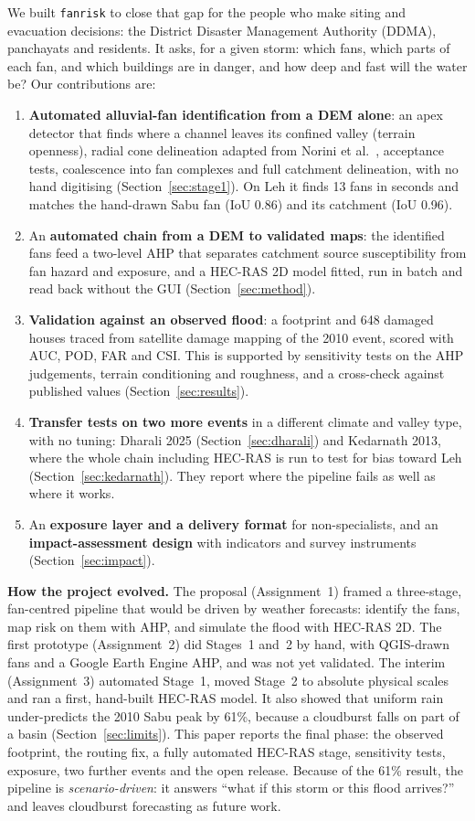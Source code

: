 \documentclass[sigconf,nonacm]{acmart}
\begin{document}
We built \texttt{fanrisk} to close that gap for the people who make siting and evacuation decisions: the District Disaster Management Authority (DDMA), panchayats and residents. It asks, for a given storm: which fans, which parts of each fan, and which buildings are in danger, and how deep and fast will the water be? Our contributions are:
\begin{enumerate}
  \item \textbf{Automated alluvial-fan identification from a DEM alone}: an apex detector that finds where a channel leaves its confined valley (terrain openness), radial cone delineation adapted from Norini et al.\ \cite{norini2016}, acceptance tests, coalescence into fan complexes and full catchment delineation, with no hand digitising (Section~\ref{sec:stage1}). On Leh it finds 13 fans in seconds and matches the hand-drawn Sabu fan (IoU 0.86) and its catchment (IoU 0.96).
  \item An \textbf{automated chain from a DEM to validated maps}: the identified fans feed a two-level AHP that separates catchment source susceptibility from fan hazard and exposure, and a HEC-RAS 2D model fitted, run in batch and read back without the GUI (Section~\ref{sec:method}).
  \item \textbf{Validation against an observed flood}: a footprint and 648 damaged houses traced from satellite damage mapping of the 2010 event, scored with AUC, POD, FAR and CSI. This is supported by sensitivity tests on the AHP judgements, terrain conditioning and roughness, and a cross-check against published values (Section~\ref{sec:results}).
  \item \textbf{Transfer tests on two more events} in a different climate and valley type, with no tuning: Dharali 2025 (Section~\ref{sec:dharali}) and Kedarnath 2013, where the whole chain including HEC-RAS is run to test for bias toward Leh (Section~\ref{sec:kedarnath}). They report where the pipeline fails as well as where it works.
  \item An \textbf{exposure layer and a delivery format} for non-specialists, and an \textbf{impact-assessment design} with indicators and survey instruments (Section~\ref{sec:impact}).
\end{enumerate}
\textbf{How the project evolved.} The proposal (Assignment~1) framed a three-stage, fan-centred pipeline that would be driven by weather forecasts: identify the fans, map risk on them with AHP, and simulate the flood with HEC-RAS 2D. The first prototype (Assignment~2) did Stages~1 and~2 by hand, with QGIS-drawn fans and a Google Earth Engine AHP, and was not yet validated. The interim (Assignment~3) automated Stage~1, moved Stage~2 to absolute physical scales and ran a first, hand-built HEC-RAS model. It also showed that uniform rain under-predicts the 2010 Sabu peak by 61\%, because a cloudburst falls on part of a basin (Section~\ref{sec:limits}). This paper reports the final phase: the observed footprint, the routing fix, a fully automated HEC-RAS stage, sensitivity tests, exposure, two further events and the open release. Because of the 61\% result, the pipeline is \emph{scenario-driven}: it answers ``what if this storm or this flood arrives?'' and leaves cloudburst forecasting as future work.
\end{document}
